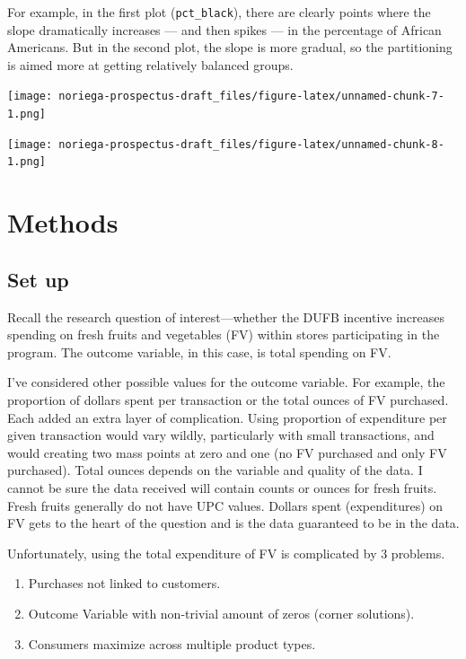 \documentclass[12pt,letterpaperpaper,]{book}
\providecommand{\tightlist}{%
  \setlength{\itemsep}{0pt}\setlength{\parskip}{0pt}}
\begin{document}
For example, in the first plot (\texttt{pct\_black}), there are clearly
points where the slope dramatically increases --- and then spikes --- in
the percentage of African Americans. But in the second plot, the slope
is more gradual, so the partitioning is aimed more at getting relatively
balanced groups.

\texttt{[image: noriega-prospectus-draft\_files/figure-latex/unnamed-chunk-7-1.png]}

\texttt{[image: noriega-prospectus-draft\_files/figure-latex/unnamed-chunk-8-1.png]}

\newpage

\hypertarget{methods-1}{\section*{Methods}\label{methods-1}}

\subsection*{Set up}\label{set-up}

Recall the research question of interest---whether the DUFB incentive
increases spending on fresh fruits and vegetables (FV) within stores
participating in the program. The outcome variable, in this case, is
total spending on FV.

I've considered other possible values for the outcome variable. For
example, the proportion of dollars spent per transaction or the total
ounces of FV purchased. Each added an extra layer of complication. Using
proportion of expenditure per given transaction would vary wildly,
particularly with small transactions, and would creating two mass points
at zero and one (no FV purchased and only FV purchased). Total ounces
depends on the variable and quality of the data. I cannot be sure the
data received will contain counts or ounces for fresh fruits. Fresh
fruits generally do not have UPC values. Dollars spent (expenditures) on
FV gets to the heart of the question and is the data guaranteed to be in
the data.

Unfortunately, using the total expenditure of FV is complicated by 3
problems.

\begin{enumerate}
\def\labelenumi{\arabic{enumi}.}
\tightlist
\item
  Purchases not linked to customers.
\item
  Outcome Variable with non-trivial amount of zeros (corner solutions).
\item
  Consumers maximize across multiple product types.
\end{enumerate}
\end{document}
